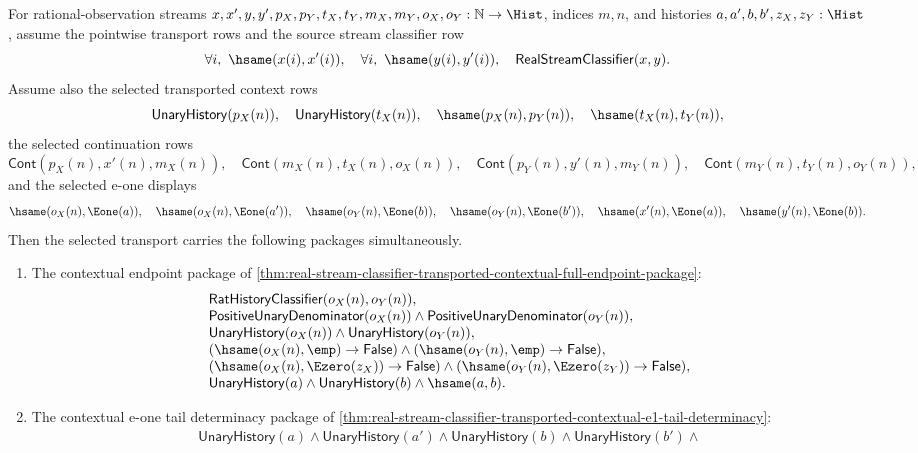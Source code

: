 \begin{theorem}
\label{thm:real-selected-transport-synchronized-package-from-stream-classifier}
For rational-observation streams
$x,x',y,y',p_X,p_Y,t_X,t_Y,m_X,m_Y,o_X,o_Y:\mathbb{N}\to\Hist$,
indices $m,n$, and histories $a,a',b,b',z_X,z_Y:\Hist$, assume the pointwise
transport rows and the source stream classifier row
$$
\forall i,\ \hsame(x(i),x'(i)),\quad
\forall i,\ \hsame(y(i),y'(i)),\quad
\mathsf{RealStreamClassifier}(x,y).
$$
Assume also the selected transported context rows
$$
\mathsf{UnaryHistory}(p_X(n)),\quad
\mathsf{UnaryHistory}(t_X(n)),\quad
\hsame(p_X(n),p_Y(n)),\quad
\hsame(t_X(n),t_Y(n)),
$$
the selected continuation rows
$$
\mathsf{Cont}(p_X(n),x'(n),m_X(n)),\quad
\mathsf{Cont}(m_X(n),t_X(n),o_X(n)),
\quad\mathsf{Cont}(p_Y(n),y'(n),m_Y(n)),\quad
\mathsf{Cont}(m_Y(n),t_Y(n),o_Y(n)),
$$
and the selected e-one displays
$$
\hsame(o_X(n),\Eone(a)),\quad
\hsame(o_X(n),\Eone(a')),\quad
\hsame(o_Y(n),\Eone(b)),\quad
\hsame(o_Y(n),\Eone(b')),\quad
\hsame(x'(n),\Eone(a)),\quad
\hsame(y'(n),\Eone(b)).
$$
Then the selected transport carries the following packages simultaneously.
\begin{enumerate}
\item The contextual endpoint package of
\autoref{thm:real-stream-classifier-transported-contextual-full-endpoint-package}:
$$
\begin{array}{l}
\mathsf{RatHistoryClassifier}(o_X(n),o_Y(n)),\\
\mathsf{PositiveUnaryDenominator}(o_X(n))\land
\mathsf{PositiveUnaryDenominator}(o_Y(n)),\\
\mathsf{UnaryHistory}(o_X(n))\land
\mathsf{UnaryHistory}(o_Y(n)),\\
(\hsame(o_X(n),\emp)\to\mathsf{False})\land
(\hsame(o_Y(n),\emp)\to\mathsf{False}),\\
(\hsame(o_X(n),\Ezero(z_X))\to\mathsf{False})\land
(\hsame(o_Y(n),\Ezero(z_Y))\to\mathsf{False}),\\
\mathsf{UnaryHistory}(a)\land\mathsf{UnaryHistory}(b)\land\hsame(a,b).
\end{array}
$$
\item The contextual e-one tail determinacy package of
\autoref{thm:real-stream-classifier-transported-contextual-e1-tail-determinacy}:
$$
\begin{array}{l}
\mathsf{UnaryHistory}(a)\land
\mathsf{UnaryHistory}(a')\land
\mathsf{UnaryHistory}(b)\land
\mathsf{UnaryHistory}(b')\land\\

\end{array}$$
\end{enumerate}
\end{theorem}
